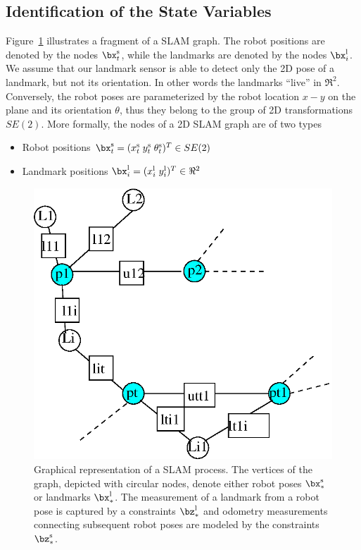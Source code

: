 \documentclass[a4paper]{article}
\begin{document}
\subsection{Identification of the State Variables}
Figure~\ref{fig:slam} illustrates a fragment of a SLAM graph.  The
robot positions are denoted by the nodes $\bx^\mathrm{s}_t$, while the
landmarks are denoted by the nodes $\bx^\mathrm{l}_i$. We assume that
our landmark sensor is able to detect only the 2D pose of a landmark,
but not its orientation.  In other words the landmarks ``live'' in
$\Re^2$.  Conversely, the robot poses are parameterized by the robot
location $x-y$ on the plane and its orientation $\theta$, thus they
belong to the group of 2D transformations $SE(2)$.  More
formally, the nodes of a 2D SLAM graph are of two types
\begin{itemize}
\item Robot positions $\bx^\mathrm{s}_t = ( x^\mathrm{s}_t  \; y^\mathrm{s}_t \; \theta^\mathrm{s}_t)^T \in SE(2)$
\item Landmark positions $\bx^\mathrm{l}_i = ( x^\mathrm{l}_i  \; y^\mathrm{l}_i )^T \in \Re^2$
\end{itemize}

\begin{figure}
\centering
\includegraphics[width=0.8\columnwidth]{pics/slam.eps}
\caption{Graphical representation of a SLAM process. The vertices of
  the graph, depicted with circular nodes, denote either robot poses
  $\bx^\mathrm{s}_*$ or landmarks $\bx^\mathrm{l}_*$. The measurement
  of a landmark from a robot pose is captured by a constraints
  $\bz^{\mathrm{l}}_*$ and odometry measurements connecting subsequent
robot poses are modeled by the constraints $\bz^\mathrm{s}_*$.}
\label{fig:slam}
\end{figure}
\end{document}
